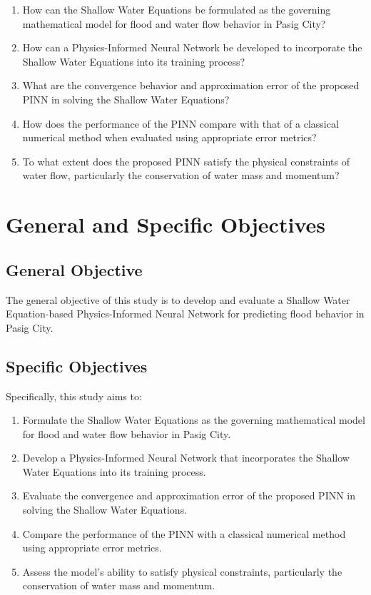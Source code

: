 \begin{enumerate}
    \item How can the Shallow Water Equations be formulated as the governing mathematical model for flood and water flow behavior in Pasig City?
    \item How can a Physics-Informed Neural Network be developed to incorporate the Shallow Water Equations into its training process?
    \item What are the convergence behavior and approximation error of the proposed PINN in solving the Shallow Water Equations?
    \item How does the performance of the PINN compare with that of a classical numerical method when evaluated using appropriate error metrics?
    \item To what extent does the proposed PINN satisfy the physical constraints of water flow, particularly the conservation of water mass and momentum?
\end{enumerate}

\section{General and Specific Objectives}


\subsection{General Objective}

The general objective of this study is to develop and evaluate a Shallow Water Equation-based Physics-Informed Neural Network for predicting flood behavior in Pasig City.

\subsection{Specific Objectives}

Specifically, this study aims to:

\begin{enumerate}
    \item Formulate the Shallow Water Equations as the governing mathematical model for flood and water flow behavior in Pasig City.

    \item Develop a Physics-Informed Neural Network that incorporates the Shallow Water Equations into its training process.

    \item Evaluate the convergence and approximation error of the proposed PINN in solving the Shallow Water Equations.

    \item Compare the performance of the PINN with a classical numerical method using appropriate error metrics.

    \item Assess the model's ability to satisfy physical constraints, particularly the conservation of water mass and momentum.
\end{enumerate}

